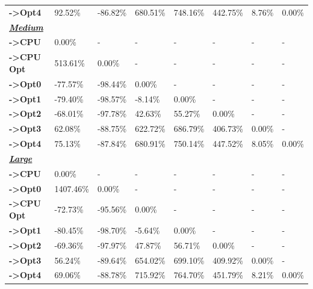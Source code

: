 \begin{table}[H]
\begin{tabular}{llllllll}
    \rowcolor[HTML]{EFEFEF} \cellcolor[HTML]{DAE8FC} \textbf{->Opt4} & 92.52\% & -86.82\% & 680.51\% & 748.16\% & 442.75\% & 	8.76\% & 	0.00\% \\
    \cellcolor[HTML]{DAE8FC} \textbf{\textbf{{\emph{{\underline{{Medium}}}}}}} &  &  &  &  &  &  &  \\
    \rowcolor[HTML]{EFEFEF} \cellcolor[HTML]{DAE8FC} \textbf{->CPU} & 0.00\% & - & - & - & - & - & - \\
    \cellcolor[HTML]{DAE8FC} \textbf{->CPU Opt} & 513.61\% & 0.00\% & - & - & - & - & - \\
    \rowcolor[HTML]{EFEFEF} \cellcolor[HTML]{DAE8FC} \textbf{->Opt0} & -77.57\% & -98.44\% & 0.00\% & - & - & - & - \\
    \cellcolor[HTML]{DAE8FC} \textbf{->Opt1} & -79.40\% & -98.57\% & -8.14\% & 0.00\% & - & - & - \\
    \rowcolor[HTML]{EFEFEF} \cellcolor[HTML]{DAE8FC} \textbf{->Opt2} & -68.01\% & -97.78\% & 42.63\% & 55.27\% & 0.00\% & - & - \\
    \cellcolor[HTML]{DAE8FC} \textbf{->Opt3} & 62.08\% & -88.75\% & 622.72\% & 686.79\% & 406.73\% & 	0.00\% & - \\
    \rowcolor[HTML]{EFEFEF} \cellcolor[HTML]{DAE8FC} \textbf{->Opt4} & 75.13\% & -87.84\% & 680.91\% & 750.14\% & 447.52\% & 	8.05\% & 	0.00\% \\
    \cellcolor[HTML]{DAE8FC} \textbf{\textbf{{\emph{{\underline{{Large}}}}}}} &  &  &  &  &  &  &  \\
    \rowcolor[HTML]{EFEFEF} \cellcolor[HTML]{DAE8FC} \textbf{->CPU} & 0.00\% & - & - & - & - & - & - \\
    \cellcolor[HTML]{DAE8FC} \textbf{->Opt0} & 1407.46\% & 0.00\% & - & - & - & - & - \\
    \rowcolor[HTML]{EFEFEF} \cellcolor[HTML]{DAE8FC} \textbf{->CPU Opt} & -72.73\% & -95.56\% & 0.00\% & - & - & - & - \\
    \cellcolor[HTML]{DAE8FC} \textbf{->Opt1} & -80.45\% & -98.70\% & -5.64\% & 0.00\% & - & - & - \\
    \rowcolor[HTML]{EFEFEF} \cellcolor[HTML]{DAE8FC} \textbf{->Opt2} & -69.36\% & -97.97\% & 47.87\% & 56.71\% & 0.00\% & - & - \\
    \cellcolor[HTML]{DAE8FC} \textbf{->Opt3} & 56.24\% & -89.64\% & 654.02\% & 699.10\% & 409.92\% & 	0.00\% & - \\
    \rowcolor[HTML]{EFEFEF} \cellcolor[HTML]{DAE8FC} \textbf{->Opt4} & 69.06\% & -88.78\% & 715.92\% & 764.70\% & 451.79\% & 	8.21\% & 	0.00\% \\

\end{tabular}
\end{table}
